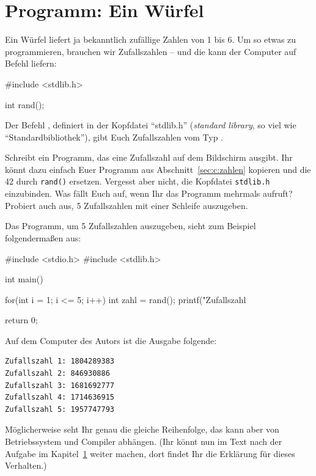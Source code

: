 \section{Programm: Ein Würfel}
\label{sec:c:wuerfel}

Ein Würfel liefert ja bekanntlich zufällige Zahlen von 1 bis 6. Um so etwas zu programmieren, brauchen wir Zufallszahlen -- und die kann der Computer auf Befehl liefern:
\begin{code}[numbers=none]
#include <stdlib.h>

int rand();
\end{code}
Der Befehl , definiert in der Kopfdatei ``stdlib.h'' (\emph{standard library}, so viel wie ``Standardbibliothek''), gibt Euch Zufallszahlen vom Typ . 

\begin{exercise}
    Schreibt ein Programm, das eine Zufallszahl auf dem Bildschirm ausgibt. Ihr könnt dazu einfach Euer Programm aus Abschnitt~\ref{sec:c:zahlen} kopieren und die 42 durch \texttt{rand()} ersetzen. Vergesst aber nicht, die Kopfdatei \texttt{stdlib.h} einzubinden. Was fällt Euch auf, wenn Ihr das Programm mehrmals aufruft? Probiert auch aus, 5 Zufallszahlen mit einer Schleife auszugeben.
    \begin{solution}
        Das Programm, um 5 Zufallszahlen auszugeben, sieht zum Beispiel folgendermaßen aus:
\begin{code}[numbers=none]
#include <stdio.h>
#include <stdlib.h>

int main() {
    for(int i = 1; i <= 5; i++) {
        int zahl = rand();
        printf("Zufallszahl %
    }

    return 0;
}
\end{code}
Auf dem Computer des Autors ist die Ausgabe folgende:
\begin{verbatim}
Zufallszahl 1: 1804289383
Zufallszahl 2: 846930886
Zufallszahl 3: 1681692777
Zufallszahl 4: 1714636915
Zufallszahl 5: 1957747793
\end{verbatim}
    Möglicherweise seht Ihr genau die gleiche Reihenfolge, das kann aber von Betriebssystem und Compiler abhängen.
    (Ihr könnt nun im Text nach der Aufgabe im Kapitel~\ref{sec:c:wuerfel} weiter machen, dort findet Ihr die Erklärung für dieses Verhalten.)
    \end{solution}
\end{exercise}

